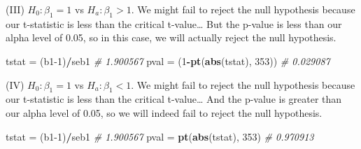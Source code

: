 \documentclass[
]{article}
\newenvironment{Shaded}{\begin{snugshade}}{\end{snugshade}}
\newcommand{\CommentTok}[1]{\textcolor[rgb]{0.56,0.35,0.01}{\textit{#1}}}
\newcommand{\DecValTok}[1]{\textcolor[rgb]{0.00,0.00,0.81}{#1}}
\newcommand{\FunctionTok}[1]{\textcolor[rgb]{0.13,0.29,0.53}{\textbf{#1}}}
\newcommand{\NormalTok}[1]{#1}
\newcommand{\OtherTok}[1]{\textcolor[rgb]{0.56,0.35,0.01}{#1}}
\newcommand{\SpecialCharTok}[1]{\textcolor[rgb]{0.81,0.36,0.00}{\textbf{#1}}}
\begin{document}
\n (III) \(H_0:\beta_{1}=1\) vs \(H_a:\beta_{1}>1\). We might fail to
reject the null hypothesis because our t-statistic is less than the
critical t-value\ldots{} But the p-value is less than our alpha level of
0.05, so in this case, we will actually reject the null hypothesis.

\begin{Shaded}
\begin{Highlighting}[]
\NormalTok{tstat }\OtherTok{=}\NormalTok{ (b1}\DecValTok{{-}1}\NormalTok{)}\SpecialCharTok{/}\NormalTok{seb1 }\CommentTok{\# 1.900567}
\NormalTok{pval }\OtherTok{=}\NormalTok{ (}\DecValTok{1}\SpecialCharTok{{-}}\FunctionTok{pt}\NormalTok{(}\FunctionTok{abs}\NormalTok{(tstat), }\DecValTok{353}\NormalTok{)) }\CommentTok{\# 0.029087}
\end{Highlighting}
\end{Shaded}

\n (IV) \(H_0:\beta_{1}=1\) vs \(H_a:\beta_{1}<1\). We might fail to
reject the null hypothesis because our t-statistic is less than the
critical t-value\ldots{} And the p-value is greater than our alpha level
of 0.05, so we will indeed fail to reject the null hypothesis.

\begin{Shaded}
\begin{Highlighting}[]
\NormalTok{tstat }\OtherTok{=}\NormalTok{ (b1}\DecValTok{{-}1}\NormalTok{)}\SpecialCharTok{/}\NormalTok{seb1 }\CommentTok{\# 1.900567}
\NormalTok{pval }\OtherTok{=} \FunctionTok{pt}\NormalTok{(}\FunctionTok{abs}\NormalTok{(tstat), }\DecValTok{353}\NormalTok{) }\CommentTok{\# 0.970913}
\end{Highlighting}
\end{Shaded}
\end{document}
